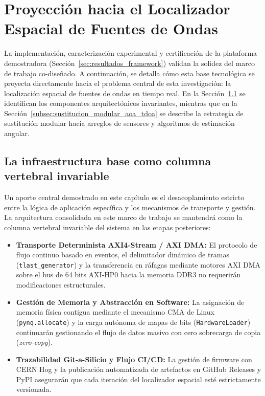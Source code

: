 \documentclass[standalone]{subfiles}
\begin{document}
\section{Proyección hacia el Localizador Espacial de Fuentes de Ondas}
\label{sec:proyeccion_localizador}

La implementación, caracterización experimental y certificación de la plataforma demostradora (Sección~\ref{sec:resultados_framework}) validan la solidez del marco de trabajo co-diseñado. A continuación, se detalla cómo esta base tecnológica se proyecta directamente hacia el problema central de esta investigación: la localización espacial de fuentes de ondas en tiempo real. En la Sección~\ref{subsec:infraestructura_invariable} se identifican los componentes arquitectónicos invariantes, mientras que en la Sección~\ref{subsec:sustitucion_modular_aoa_tdoa} se describe la estrategia de sustitución modular hacia arreglos de sensores y algoritmos de estimación angular.

\subsection{La infraestructura base como columna vertebral invariable}
\label{subsec:infraestructura_invariable}

Un aporte central demostrado en este capítulo es el desacoplamiento estricto entre la lógica de aplicación específica y los mecanismos de transporte y gestión. La arquitectura consolidada en este marco de trabajo se mantendrá como la columna vertebral invariable del sistema en las etapas posteriores:

\begin{itemize}
    \item \textbf{Transporte Determinista AXI4-Stream / AXI DMA:} El protocolo de flujo continuo basado en eventos, el delimitador dinámico de tramas (\texttt{tlast\_generator}) y la transferencia en ráfagas mediante motores AXI DMA sobre el bus de 64 bits AXI-HP0 hacia la memoria DDR3 no requerirán modificaciones estructurales.
    
    \item \textbf{Gestión de Memoria y Abstracción en Software:} La asignación de memoria física contigua mediante el mecanismo CMA de Linux (\texttt{pynq.allocate}) y la carga autónoma de mapas de bits (\texttt{HardwareLoader}) continuarán gestionando el flujo de datos masivo con cero sobrecarga de copia (\textit{zero-copy}).
    
    \item \textbf{Trazabilidad Git-a-Silicio y Flujo CI/CD:} La gestión de firmware con CERN Hog y la publicación automatizada de artefactos en GitHub Releases y PyPI asegurarán que cada iteración del localizador espacial esté estrictamente versionada.
\end{itemize}
\end{document}
